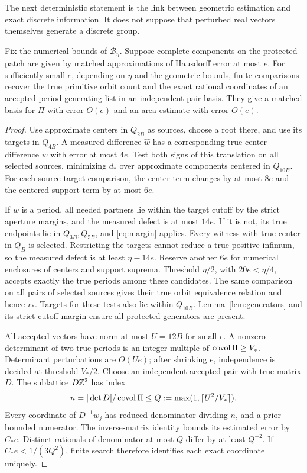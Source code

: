 The next deterministic statement is the link between geometric estimation
and exact discrete information. It does not suppose that perturbed real
vectors themselves generate a discrete group.
\begin{lemma}
\label{lem:locking}
Fix the numerical bounds of $\mathcal B_\eta$. Suppose complete
components on the protected patch are given by matched approximations
of Hausdorff error at most $e$. For sufficiently small $e$, depending
on $\eta$ and the geometric bounds, finite comparisons recover the true
primitive orbit count and the exact rational coordinates of an accepted
period-generating list in an independent-pair basis. They give a matched
basis for $\Pi$ with error $O(e)$ and an area estimate with error $O(e)$.
\end{lemma}
\begin{proof}
Use approximate centers in $Q_{2B}$ as sources, choose a root there,
and use its targets in $Q_{4B}$. A measured difference $\widehat w$
has a corresponding true center difference $w$ with error at most
$4e$. Test both signs of this translation on all selected sources,
minimizing $d_*$ over approximate components centered in $Q_{10B}$.
For each source-target comparison, the center term changes by at most
$8e$ and the centered-support term by at most $6e$.

If $w$ is a period, all needed partners lie within the target cutoff
by the strict aperture margins, and the measured defect is at most
$14e$. If it is not, its true endpoints lie in $Q_{3B},Q_{5B}$, and
\eqref{eq:margin} applies. Every witness with true center in $Q_B$ is
selected. Restricting the targets cannot reduce a true positive infimum,
so the measured defect is at least $\eta-14e$. Reserve another $6e$
for numerical enclosures of centers and support suprema. Threshold
$\eta/2$, with $20e<\eta/4$, accepts exactly the true periods among
these candidates. The same comparison on all pairs of selected sources
gives their true orbit equivalence relation and hence $r_*$. Targets
for these tests also lie within $Q_{10B}$. Lemma~\ref{lem:generators}
and its strict cutoff margin ensure all protected generators are present.

All accepted vectors have norm at most $U=12B$ for small $e$. A nonzero
determinant of two true periods is an integer multiple of
$\operatorname{covol}\Pi\ge V_*$. Determinant perturbations are $O(Ue)$; after
shrinking $e$, independence is decided at threshold $V_*/2$. Choose
an independent accepted pair with true matrix $D$. The sublattice
$D\mathbb Z^2$ has index
\[
       n=|\det D|/\operatorname{covol}\Pi\le Q:=\max(1,\lceil U^2/V_*\rceil).
\]
Every coordinate of $D^{-1}w_j$ has reduced denominator dividing $n$,
and a prior-bounded numerator. The inverse-matrix identity bounds its
estimated error by $C_*e$. Distinct rationals of denominator at most
$Q$ differ by at least $Q^{-2}$. If $C_*e<1/(3Q^2)$, finite search
therefore identifies each exact coordinate uniquely.


\end{proof}
